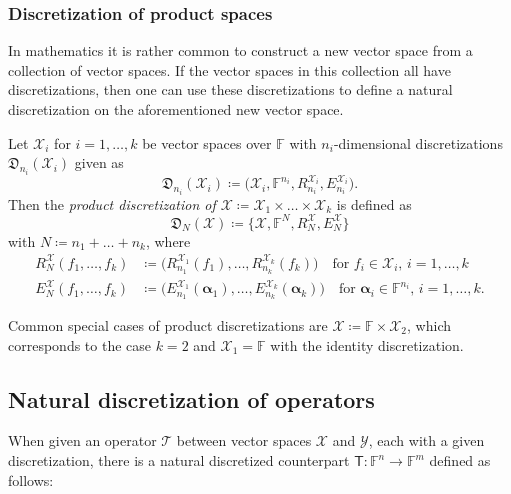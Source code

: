 \documentclass[a4paper]{paper}
\newcommand*{\SPC}[1]{{\ensuremath{\mathscr{#1}}}}
\newcommand*{\SPCX}{\SPC{X}}
\newcommand*{\SPCY}{\SPC{Y}}
\newcommand*{\FIELD}{{\ensuremath{\mathbb{F}}}}
\newcommand*{\Fn}{{\ensuremath{\FIELD^n}}}
\newcommand*{\Fm}{{\ensuremath{\FIELD^m}}}
\newcommand*{\OP}[1]{{\ensuremath{\mathcal{#1}}}}
\newcommand*{\OPT}{\OP{T}}
\newcommand{\DISCOP}[1]{{\ensuremath{\mathsf{#1}}}}
\newcommand*{\DISCOPT}{\DISCOP{T}}
\newcommand*{\EXT}[2]{\ensuremath{E_{#1}^{#2}}}
\newcommand*{\REST}[2]{\ensuremath{R_{#1}^{#2}}}
\newcommand*{\DISCR}[2]{{\ensuremath{\mathfrak{D}_{#1}(#2)}}}
\DeclareMathOperator{\DEFEQ}{{\coloneqq}}
\newcommand*{\BDalpha}{\boldsymbol{\alpha}}
\begin{document}
\subsubsection{Discretization of product spaces}
\label{subsubsec:discr:space:prod}

In mathematics it is rather common to construct a new vector space from a collection of vector spaces. If the vector 
spaces in this collection all have discretizations, then one can use these discretizations to define a natural 
discretization on the aforementioned new vector space.

\begin{definition}
 \label{def:discr:space:prod:prod_space_discr}
 Let $\SPCX_i$ for $i=1,\dots,k$ be vector spaces over $\FIELD$ with $n_i$-dimensional discretizations 
 $\DISCR{n_i}{\SPCX_i}$ given as
 \begin{equation*}
  \DISCR{n_i}{\SPCX_i} \DEFEQ  \bigl( \SPCX_i, \FIELD^{n_i}, \REST{n_i}{\SPCX_i}, \EXT{n_i}{\SPCX_i} \bigr). 
 \end{equation*}
 Then the \emph{product discretization of $\SPCX \DEFEQ  \SPCX_1 \times \dots \times \SPCX_k$} is defined as 
 \begin{equation*}
  \DISCR{N}{\SPCX} \DEFEQ \{\SPCX, \FIELD^N, \REST{N}{\SPCX}, \EXT{N}{\SPCX} \}
 \end{equation*}
 with $N \DEFEQ  n_1 + \dots + n_k$, where
 \begin{align*}
  \REST{N}{\SPCX}(f_1,\dots,f_k) &\DEFEQ  \bigl( \REST{n_1}{\SPCX_1}(f_1),\dots,\REST{n_k}{\SPCX_k}(f_k) \bigr)
  \quad\text{for $f_i\in \SPCX_i$, $i=1,\dots,k$} \\
  \EXT{N}{\SPCX}(f_1,\dots,f_k) &\DEFEQ  \bigl( \EXT{n_1}{\SPCX_1}(\BDalpha_1),\dots,\EXT{n_k}{\SPCX_k}(\BDalpha_k) 
  \bigr)
  \quad\text{for $\BDalpha_i\in \FIELD^{n_i}$, $i=1,\dots,k$.}
 \end{align*}
\end{definition}

%
Common special cases of product discretizations are $\SPCX\DEFEQ \FIELD \times \SPCX_2$, which corresponds to the 
case 
$k=2$ and $\SPCX_1=\FIELD$ with the identity discretization.



\subsection{Natural discretization of operators}
\label{subsec:discr:operator}

When given an operator $\OPT$ between vector spaces $\SPCX$ and $\SPCY$, each with a given discretization, 
there is a natural discretized counterpart $\DISCOPT \colon \Fn \to \Fm$ defined as follows:
\end{document}

